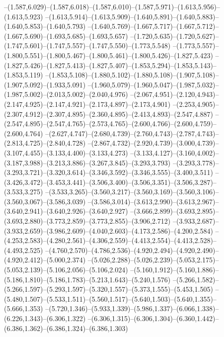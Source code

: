   --(1.587,6.029)--(1.587,6.018)--(1.587,6.010)--(1.587,5.971)--(1.613,5.956)--(1.613,5.923)%
  --(1.613,5.914)--(1.613,5.909)--(1.640,5.891)--(1.640,5.883)--(1.640,5.853)--(1.640,5.793)%
  --(1.640,5.769)--(1.667,5.717)--(1.667,5.712)--(1.667,5.690)--(1.693,5.685)--(1.693,5.657)%
  --(1.720,5.635)--(1.720,5.627)--(1.747,5.601)--(1.747,5.557)--(1.747,5.550)--(1.773,5.548)%
  --(1.773,5.557)--(1.800,5.551)--(1.800,5.467)--(1.800,5.461)--(1.800,5.426)--(1.827,5.423)%
  --(1.827,5.426)--(1.827,5.413)--(1.827,5.407)--(1.853,5.294)--(1.853,5.143)--(1.853,5.119)%
  --(1.853,5.108)--(1.880,5.102)--(1.880,5.108)--(1.907,5.108)--(1.907,5.092)--(1.933,5.091)%
  --(1.960,5.079)--(1.960,5.047)--(1.987,5.032)--(1.987,5.002)--(2.013,5.002)--(2.040,4.976)%
  --(2.067,4.951)--(2.120,4.943)--(2.147,4.925)--(2.147,4.921)--(2.173,4.897)--(2.173,4.901)%
  --(2.253,4.905)--(2.307,4.912)--(2.307,4.895)--(2.360,4.895)--(2.413,4.893)--(2.547,4.887)%
  --(2.547,4.895)--(2.547,4.765)--(2.573,4.765)--(2.600,4.766)--(2.600,4.759)--(2.600,4.764)%
  --(2.627,4.747)--(2.680,4.739)--(2.760,4.743)--(2.787,4.743)--(2.813,4.725)--(2.840,4.728)%
  --(2.867,4.732)--(2.920,4.739)--(3.000,4.739)--(3.107,4.455)--(3.133,4.400)--(3.133,4.273)%
  --(3.133,4.127)--(3.160,4.002)--(3.187,3.988)--(3.213,3.886)--(3.267,3.845)--(3.293,3.793)%
  --(3.293,3.778)--(3.293,3.721)--(3.320,3.614)--(3.346,3.592)--(3.346,3.555)--(3.400,3.511)%
  --(3.426,3.472)--(3.453,3.441)--(3.506,3.400)--(3.506,3.351)--(3.506,3.287)--(3.533,3.275)%
  --(3.533,3.265)--(3.560,3.217)--(3.560,3.169)--(3.560,3.106)--(3.560,3.067)--(3.586,3.039)%
  --(3.586,3.014)--(3.613,2.990)--(3.613,2.967)--(3.640,2.941)--(3.640,2.926)--(3.640,2.927)%
  --(3.666,2.899)--(3.693,2.895)--(3.693,2.880)--(3.773,2.859)--(3.773,2.855)--(3.906,2.712)%
  --(3.933,2.687)--(3.933,2.659)--(3.986,2.609)--(4.040,2.603)--(4.173,2.586)--(4.200,2.584)%
  --(4.253,2.583)--(4.280,2.561)--(4.306,2.559)--(4.413,2.554)--(4.413,2.528)--(4.493,2.525)%
  --(4.760,2.570)--(4.786,2.536)--(4.920,2.494)--(4.920,2.490)--(4.920,2.412)--(5.000,2.374)%
  --(5.026,2.288)--(5.026,2.239)--(5.053,2.175)--(5.053,2.139)--(5.106,2.056)--(5.106,2.024)%
  --(5.160,1.912)--(5.160,1.886)--(5.186,1.810)--(5.186,1.783)--(5.213,1.643)--(5.240,1.576)%
  --(5.266,1.582)--(5.266,1.597)--(5.293,1.597)--(5.320,1.557)--(5.373,1.555)--(5.453,1.505)%
  --(5.480,1.507)--(5.533,1.511)--(5.560,1.517)--(5.640,1.503)--(5.640,1.355)--(5.666,1.353)%
  --(5.720,1.346)--(5.933,1.339)--(5.986,1.337)--(6.066,1.338)--(6.226,1.343)--(6.306,1.322)%
  --(6.306,1.315)--(6.306,1.304)--(6.360,1.442)--(6.386,1.362)--(6.386,1.324)--(6.386,1.303)%
